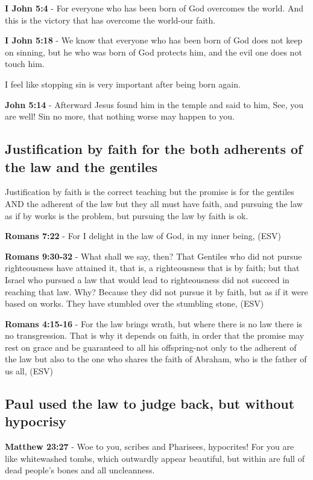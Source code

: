 \documentclass[11pt]{article}
\begin{document}
\textbf{I John 5:4} - For everyone who has been born of God overcomes the world. And this is the victory that has overcome the world-our faith.

\textbf{I John 5:18} - We know that everyone who has been born of God does not keep on sinning, but he who was born of God protects him, and the evil one does not touch him.

I feel like stopping sin is very important after being born again.

\textbf{John 5:14} - Afterward Jesus found him in the temple and said to him, See, you are well! Sin no more, that nothing worse may happen to you.

\subsection{Justification by faith for the both adherents of the law and the gentiles}
\label{sec:org119e40c}
Justification by faith is the correct teaching but the promise is for the gentiles AND the adherent of the law but they all must have faith, and pursuing the law as if by works is the problem, but pursuing the law by faith is ok.

\textbf{Romans 7:22} - For I delight in the law of God, in my inner being, (ESV)

\textbf{Romans 9:30-32} - What shall we say, then? That Gentiles who did not pursue righteousness have attained it, that is, a righteousness that is by faith; but that Israel who pursued a law that would lead to righteousness did not succeed in reaching that law. Why? Because they did not pursue it by faith, but as if it were based on works. They have stumbled over the stumbling stone, (ESV)

\textbf{Romans 4:15-16} - For the law brings wrath, but where there is no law there is no transgression. That is why it depends on faith, in order that the promise may rest on grace and be guaranteed to all his offspring-not only to the adherent of the law but also to the one who shares the faith of Abraham, who is the father of us all, (ESV)

\subsection{Paul used the law to judge back, but without hypocrisy}
\label{sec:orgdc7a877}
\textbf{Matthew 23:27} - Woe to you, scribes and Pharisees, hypocrites! For you are like whitewashed tombs, which outwardly appear beautiful, but within are full of dead people's bones and all uncleanness.
\end{document}
